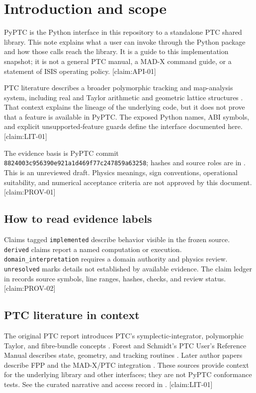 \section{Introduction and scope}
\label{sec:introduction}

PyPTC is the Python interface in this repository to a standalone PTC shared library. This note explains what a user can invoke through the Python package and how those calls reach the library. It is a guide to this implementation snapshot; it is not a general PTC manual, a MAD-X command guide, or a statement of ISIS operating policy. [claim:API-01]

PTC literature describes a broader polymorphic tracking and map-analysis system, including real and Taylor arithmetic and geometric lattice structures \cite{ForestSchmidtMcIntosh2002}. That context explains the lineage of the underlying code, but it does not prove that a feature is available in PyPTC. The exposed Python names, ABI symbols, and explicit unsupported-feature guards define the interface documented here. [claim:LIT-01]

The evidence basis is PyPTC commit \texttt{8824003c956390e921a1d469f77c247859a63258}; hashes and source roles are in . This is an unreviewed draft. Physics meanings, sign conventions, operational suitability, and numerical acceptance criteria are not approved by this document. [claim:PROV-01]

\subsection{How to read evidence labels}

Claims tagged \texttt{implemented} describe behavior visible in the frozen source. \texttt{derived} claims report a named computation or execution. \texttt{domain\_interpretation} requires a domain authority and physics review. \texttt{unresolved} marks details not established by available evidence. The claim ledger in  records source symbols, line ranges, hashes, checks, and review status. [claim:PROV-02]

\subsection{PTC literature in context}

The original PTC report introduces PTC's symplectic-integrator, polymorphic Taylor, and fibre-bundle concepts \cite{ForestSchmidtMcIntosh2002}. Forest and Schmidt's PTC User's Reference Manual describes state, geometry, and tracking routines \cite{ForestSchmidtPTCManual2010}. Later author papers describe FPP and the MAD-X/PTC integration \cite{ForestNogiwaSchmidt2006FPPPTC,ForestNogiwaSchmidt2006FPPDoc,Schmidt2005MADXPTC,SkowronskiSchmidtForest2007}. These sources provide context for the underlying library and other interfaces; they are not PyPTC conformance tests. See the curated narrative and access record in . [claim:LIT-01]
